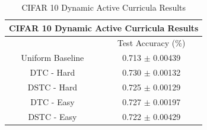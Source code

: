 \begin{table}[h!]
\caption{CIFAR 10 Dynamic Active Curricula  Results} \label{tab:CIFAR DACResults}
\begin{tabular}{|c||c|}
\hline
\multicolumn{2}{|c|}{CIFAR 10 Dynamic Active Curricula Results} \\
\hline
 & Test Accuracy (\%) \\
\hline
Uniform Baseline&  0.713 $\pm$ 0.00439\\
\hline
DTC - Hard&  0.730 $\pm$ 0.00132 \\
\hline
DSTC - Hard & 0.725 $\pm$ 0.00129\\
\hline
DTC - Easy & 0.727 $\pm$ 0.00197 \\
\hline
DSTC - Easy & 0.722 $\pm$ 0.00429 \\
\hline
\end{tabular}
\end{table}



